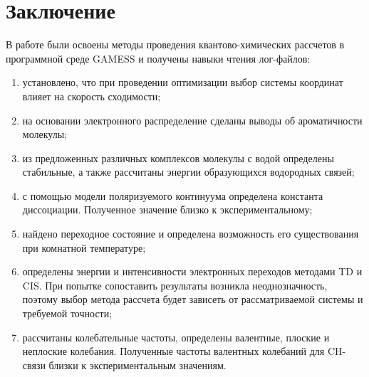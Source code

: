 \section*{Заключение}
В работе были освоены методы проведения квантово-химических рассчетов в программной среде GAMESS и получены навыки чтения лог-файлов:
\begin{enumerate}
    \item установлено, что при проведении оптимизации выбор системы координат влияет на скорость сходимости;
    \item на основании электронного распределение сделаны выводы об ароматичности молекулы;
    \item из предложенных различных комплексов молекулы с водой определены стабильные, а также рассчитаны энергии образующихся водородных связей; 
    \item с помощью модели поляризуемого континуума определена константа диссоциации. Полученное значение близко к экспериментальному;
    \item найдено переходное состояние и определена возможность его существования при комнатной температуре; 
    \item определены энергии и интенсивности электронных переходов методами TD и CIS. При попытке сопоставить результаты возникла неоднозначность, поэтому выбор метода рассчета будет зависеть от рассматриваемой системы и требуемой точности;
    \item рассчитаны колебательные частоты, определены валентные, плоские и неплоские колебания. Полученные частоты валентных колебаний для CH-связи близки к экспериментальным значениям.
\end{enumerate}
